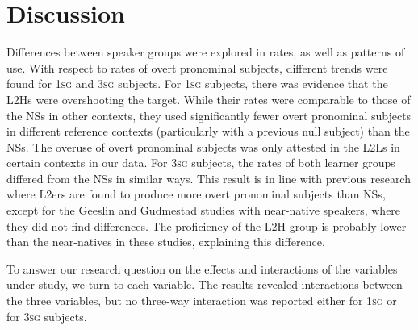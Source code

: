 \documentclass[output=paper,colorlinks,citecolor=brown,draftmode]{langscibook}
\begin{document}
\section{Discussion}

Differences between speaker groups were explored in rates, as well as patterns of use. With respect to rates of overt pronominal subjects, different trends were found for 1\textsc{sg} and 3\textsc{sg} subjects. For 1\textsc{sg} subjects, there was evidence that the L2Hs were overshooting the target. While their rates were comparable to those of the NSs in other contexts, they used significantly fewer overt pronominal subjects in different reference contexts (particularly with a previous null subject) than the NSs. The overuse of overt pronominal subjects was only attested in the L2Ls in certain contexts in our data. For 3\textsc{sg} subjects, the rates of both learner groups differed from the NSs in similar ways. This result is in line with previous research where L2ers are found to produce more overt pronominal subjects than NSs, except for the Geeslin and Gudmestad studies with near-native speakers, where they did not find differences. The proficiency of the L2H group is probably lower than the near-natives in these studies, explaining this difference.

To answer our research question on the effects and interactions of the variables under study, we turn to each variable. The results revealed interactions between the three variables, but no three-way interaction was reported either for 1\textsc{sg} or for 3\textsc{sg} subjects.
\end{document}
